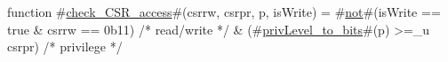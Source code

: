 function #\hyperref[sailRISCVzcheckzyCSRzyaccess]{check\_CSR\_access}#(csrrw, csrpr, p, isWrite) =
    #\hyperref[sailRISCVznot]{not}#(isWrite == true & csrrw == 0b11)  /* read/write */
  & (#\hyperref[sailRISCVzprivLevelzytozybits]{privLevel\_to\_bits}#(p) >=_u csrpr)      /* privilege */
